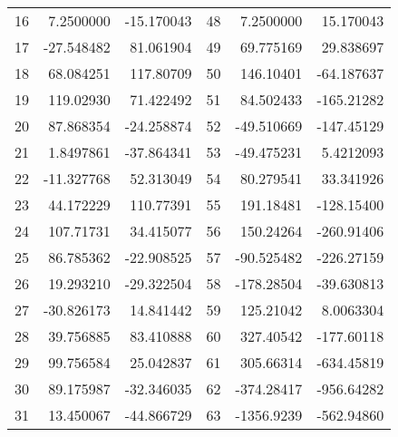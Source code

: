 \begin{figure}
\begin{tabular}{lrrlrr}
        16 &  7.2500000 & -15.170043 & 48 &  7.2500000 &  15.170043 \\
        17 & -27.548482 &  81.061904 & 49 &  69.775169 &  29.838697 \\
        18 &  68.084251 &  117.80709 & 50 &  146.10401 & -64.187637 \\
        19 &  119.02930 &  71.422492 & 51 &  84.502433 & -165.21282 \\
        20 &  87.868354 & -24.258874 & 52 & -49.510669 & -147.45129 \\
        21 &  1.8497861 & -37.864341 & 53 & -49.475231 &  5.4212093 \\
        22 & -11.327768 &  52.313049 & 54 &  80.279541 &  33.341926 \\
        23 &  44.172229 &  110.77391 & 55 &  191.18481 & -128.15400 \\
        24 &  107.71731 &  34.415077 & 56 &  150.24264 & -260.91406 \\
        25 &  86.785362 & -22.908525 & 57 & -90.525482 & -226.27159 \\
        26 &  19.293210 & -29.322504 & 58 & -178.28504 & -39.630813 \\
        27 & -30.826173 &  14.841442 & 59 &  125.21042 &  8.0063304 \\
        28 &  39.756885 &  83.410888 & 60 &  327.40542 & -177.60118 \\
        29 &  99.756584 &  25.042837 & 61 &  305.66314 & -634.45819 \\
        30 &  89.175987 & -32.346035 & 62 & -374.28417 & -956.64282 \\
        31 &  13.450067 & -44.866729 & 63 & -1356.9239 & -562.94860 \\
    \end{tabular}
    \label{table:08_03}
\end{figure}

